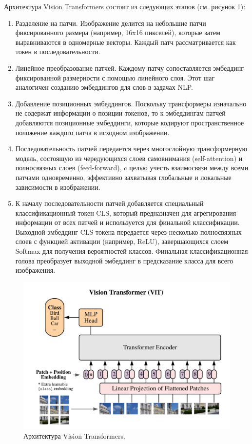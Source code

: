 \documentclass[a4paper,12pt]{extarticle}
\begin{document}
Архитектура Vision Transformers состоит из следующих этапов (см. рисунок \ref{fig:vit}):
\begin{enumerate}[label=\arabic*.]
	\item Разделение на патчи. Изображение делится на небольшие патчи фиксированного размера (например, 16x16 пикселей), которые затем выравниваются в одномерные векторы. Каждый патч рассматривается как токен в последовательности.
	\item Линейное преобразование патчей. Каждому патчу сопоставляется эмбеддинг фиксированной размерности с помощью линейного слоя. Этот шаг аналогичен созданию эмбеддингов для слов в задачах NLP.
	\item Добавление позиционных эмбеддингов. Поскольку трансформеры изначально не содержат информации о позиции токенов, то к эмбеддингам патчей добавляются позиционные эмбеддинги, которые кодируют пространственное положение каждого патча в исходном изображении.
	\item Последовательность патчей передается через многослойную трансформерную модель, состоящую из чередующихся слоев самовнимания (self-attention) и полносвязных слоев (feed-forward), c целью учесть взаимосвязи между всеми патчами одновременно, эффективно захватывая глобальные и локальные зависимости в изображении.
	\item К началу последовательности патчей добавляется специальный классификационный токен CLS, который предназначен для агрегирования информации от всех патчей и используется для финальной классификации. Выходной эмбеддинг CLS токена передается через несколько полносвязных слоев с функцией активации (например, ReLU), завершающихся слоем Softmax для получения вероятностей классов. Финальная классификационная голова преобразует выходной эмбеддинг в предсказание класса для всего изображения.
\end{enumerate}

\begin{figure}[ht]
	\centering
	\includegraphics[scale=0.3]{vit.png}
	\caption{Архитектура Vision Transformers\cite{vit}.}
	\label{fig:vit}
\end{figure}
\end{document}
